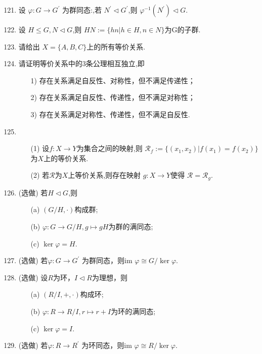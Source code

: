\documentclass[a4paper,12pt]{article}
\begin{document}
\begin{enumerate}\setcounter{enumi}{120}
    \item 设 $\varphi:G\to G^{\prime}$ 为群同态:,若 $N^{\prime}\lhd G^{\prime}$,则 $\varphi^{-1}(N^{\prime})\lhd G$.
    \item 设 $H\leq G,N\lhd G$,则 $HN:=\{hn|h\in H,n\in N\}$为G的子群.
    \item 请给出 $X=\{A,B,C\}$上的所有等价关系.
    \item 请证明等价关系中的3条公理相互独立,即
    \begin{enumerate}
        \item[1)] 存在关系满足自反性、对称性，但不满足传递性；
        \item[2)] 存在关系满足自反性、传递性，但不满足对称性；
        \item[3)] 存在关系满足对称性、传递性，但不满足自反性.
    \end{enumerate}
    \item \begin{enumerate}
        \item[(1)] 设$f:X\to Y$为集合之间的映射,则 $\mathcal{R}_f:=\{(x_1,x_2)|f(x_1)=f(x_2)\}$为$X$上的等价关系.
        \item[(2)] 若$\mathcal{R}$为$X$上等价关系,则存在映射 $g:X\to Y$使得 $\mathcal{R}=\mathcal{R}_g$.
    \end{enumerate}
    \item {\color{red} (选做)} 若$H\lhd G$,则
    \begin{enumerate}
        \item[(a)] $(G/H,\cdot)$构成群;
        \item[(b)] $\varphi:G\to G/H,g\mapsto gH$为群的满同态;
        \item[(c)] $\ker \varphi =H$.
    \end{enumerate}
    \item {\color{red} (选做)} 若$\varphi:G\to G^{\prime}$ 为群同态，则im $\varphi \cong G/\ker \varphi$.
    \item {\color{red} (选做)} 设$R$为环，$I\lhd R$为理想，则
    \begin{enumerate}
        \item[(a)] $(R/I,+,\cdot)$构成环;
        \item[(b)] $\varphi:R\to R/I,r\mapsto r+I$为环的满同态;
        \item[(c)] $\ker \varphi =I$.
    \end{enumerate}
    \item {\color{red} (选做)} 若$\varphi:R\to R^{\prime}$ 为环同态，则im $\varphi \cong R/\ker \varphi$.

\end{enumerate}
\end{document}
